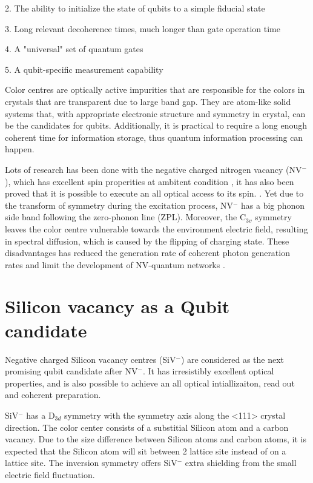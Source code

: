 2. The ability to initialize the state of qubits to a simple fiducial state

3. Long relevant decoherence times, much longer than gate operation time

4. A "universal" set of quantum gates

5. A qubit-specific measurement capability

Color centres are optically active impurities that are responsible for the colors in crystals that are transparent due to large band gap. They are atom-like solid systems that, with appropriate electronic structure and symmetry in crystal, can be the candidates for qubits. Additionally, it is practical to require a long enough coherent time for information storage, thus quantum information processing can happen.  

Lots of research has been done with the negative charged nitrogen vacancy (NV$^{-}$), which has excellent spin properities at ambitent condition \citep{childress_atom-like_2014}, it has also been proved that it is possible to execute an all optical access to its spin. \citep{bassett_ultrafast_2014,buckley_spin-light_2010,santori_coherent_2006-1}. Yet due to the transform of symmetry during the excitation process, NV$^{-}$ has a big phonon side band following the zero-phonon line (ZPL). Moreover, the C$_{3v}$ symmetry leaves the color centre vulnerable towards the environment electric field, resulting in spectral diffusion, which is caused by the flipping of charging state. These disadvantages has reduced the generation rate of coherent photon generation rates and limit the development of NV-quantum networks \citep{rogers_all-optical_2014}.

\section[Silicon vacancy as a Qubit candidate]{Silicon vacancy as a Qubit candidate}

Negative charged Silicon vacancy centres (SiV$^{-}$) are considered as the next promising qubit candidate after NV$^{-}$. It has irresistibly excellent optical properties, and is also possible to achieve an all optical intiallizaiton, read out and coherent preparation.

SiV$^{-}$ has a D$_{3d}$ symmetry with the symmetry axis along the <111> crystal direction. The color center consists of a substitial Silicon atom and a carbon vacancy. Due to the size difference between Silicon atoms and carbon atoms, it is expected that the Silicon atom will sit between 2 lattice site instead of on a lattice site\citep{goss_twelve-line_1996, gali_textitab_2013}. The inversion symmetry offers SiV$^{-}$ extra shielding from the small electric field fluctuation.

